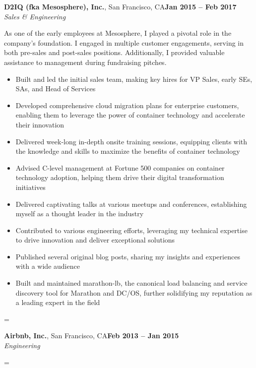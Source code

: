 \documentclass[margin,line]{resume}
\newenvironment{absolutelynopagebreak}
{\par\nobreak\vfil\penalty0\vfilneg
\vtop\bgroup}
{\par\xdef\tpd{\the\prevdepth}\egroup
\prevdepth=\tpd}
\begin{document}
\begin{resume}
\vspace{5mm}

\begin{absolutelynopagebreak}
\textbf{D2IQ (fka Mesosphere), Inc.}, San Francisco, CA\hfill \textbf{Jan 2015 -- Feb 2017}\vspace{2mm}\\\vspace{1mm}%
\textsl{Sales \& Engineering}

As one of the early employees at Mesosphere, I played a pivotal role in the company's foundation. I engaged in multiple customer engagements, serving in both pre-sales and post-sales positions. Additionally, I provided valuable assistance to management during fundraising pitches.

\begin{itemize}
\item Built and led the initial sales team, making key hires for VP Sales, early SEs, SAs, and Head of Services
\item Developed comprehensive cloud migration plans for enterprise customers, enabling them to leverage the power of container technology and accelerate their innovation
\item Delivered week-long in-depth onsite training sessions, equipping clients with the knowledge and skills to maximize the benefits of container technology
\item Advised C-level management at Fortune 500 companies on container technology adoption, helping them drive their digital transformation initiatives
\item Delivered captivating talks at various meetups and conferences, establishing myself as a thought leader in the industry
\item Contributed to various engineering efforts, leveraging my technical expertise to drive innovation and deliver exceptional solutions
\item Published several original blog posts, sharing my insights and experiences with a wide audience
\item Built and maintained marathon-lb, the canonical load balancing and service discovery tool for Marathon and DC/OS, further solidifying my reputation as a leading expert in the field
\end{itemize}
\end{absolutelynopagebreak}

\vspace{5mm}

\begin{absolutelynopagebreak}
\textbf{Airbnb, Inc.}, San Francisco, CA\hfill \textbf{Feb 2013 -- Jan 2015}\vspace{2mm}\\\vspace{1mm}%
\textsl{Engineering}


\end{absolutelynopagebreak}
\end{resume}
\end{document}
